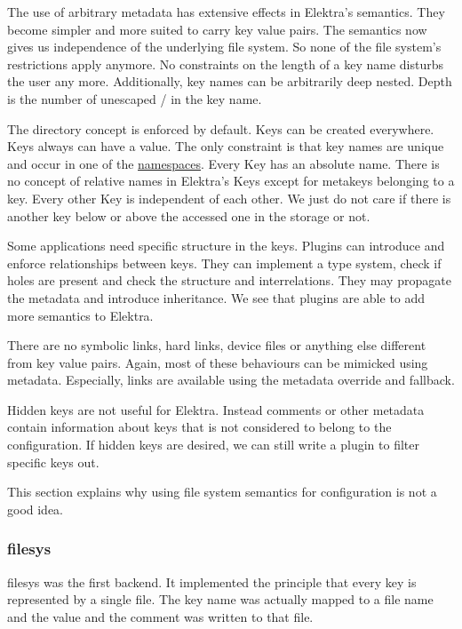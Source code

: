 The use of arbitrary metadata has extensive effects in Elektra's semantics. They become simpler and more suited to carry key value pairs. The semantics now gives us independence of the underlying file system. So none of the file system's restrictions apply anymore. No constraints on the length of a key name disturbs the user any more. Additionally, key names can be arbitrarily deep nested. Depth is the number of unescaped {\ttfamily /} in the key name.

The directory concept is enforced by default. Keys can be created everywhere. Keys always can have a value. The only constraint is that key names are unique and occur in one of the \hyperlink{md_doc_help_elektra-namespaces_doc_help_elektra-namespaces_md}{namespaces}. Every Key has an absolute name. There is no concept of relative names in Elektra's Keys except for metakeys belonging to a key. Every other Key is independent of each other. We just do not care if there is another key below or above the accessed one in the storage or not.

Some applications need specific structure in the keys. Plugins can introduce and enforce relationships between keys. They can implement a type system, check if holes are present and check the structure and interrelations. They may propagate the metadata and introduce inheritance. We see that plugins are able to add more semantics to Elektra.

There are no symbolic links, hard links, device files or anything else different from key value pairs. Again, most of these behaviours can be mimicked using metadata. Especially, links are available using the metadata {\ttfamily override} and {\ttfamily fallback}.

Hidden keys are not useful for Elektra. Instead comments or other metadata contain information about keys that is not considered to belong to the configuration. If hidden keys are desired, we can still write a plugin to filter specific keys out.

This section explains why using file system semantics for configuration is not a good idea.

\subsubsection*{filesys}

{\ttfamily filesys} was the first backend. It implemented the principle that every key is represented by a single file. The key name was actually mapped to a file name and the value and the comment was written to that file.

